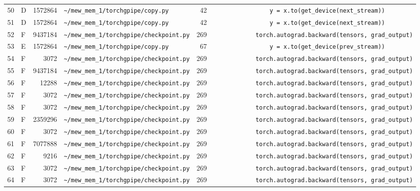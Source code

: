 \documentclass{article}
\begin{document}
\begin{longtable}{r l r p{6.5cm} r p{7.0cm}}
50 & D & 1572864 & \lstinline|~/mew_mem_1/torchgpipe/copy.py| & 42 & \lstinline|                y = x.to(get_device(next_stream))| \\
51 & D & 1572864 & \lstinline|~/mew_mem_1/torchgpipe/copy.py| & 42 & \lstinline|                y = x.to(get_device(next_stream))| \\
52 & F & 9437184 & \lstinline|~/mew_mem_1/torchgpipe/checkpoint.py| & 269 & \lstinline|            torch.autograd.backward(tensors, grad_output)| \\
53 & E & 1572864 & \lstinline|~/mew_mem_1/torchgpipe/copy.py| & 67 & \lstinline|                y = x.to(get_device(prev_stream))| \\
54 & F & 3072 & \lstinline|~/mew_mem_1/torchgpipe/checkpoint.py| & 269 & \lstinline|            torch.autograd.backward(tensors, grad_output)| \\
55 & F & 9437184 & \lstinline|~/mew_mem_1/torchgpipe/checkpoint.py| & 269 & \lstinline|            torch.autograd.backward(tensors, grad_output)| \\
56 & F & 12288 & \lstinline|~/mew_mem_1/torchgpipe/checkpoint.py| & 269 & \lstinline|            torch.autograd.backward(tensors, grad_output)| \\
57 & F & 3072 & \lstinline|~/mew_mem_1/torchgpipe/checkpoint.py| & 269 & \lstinline|            torch.autograd.backward(tensors, grad_output)| \\
58 & F & 3072 & \lstinline|~/mew_mem_1/torchgpipe/checkpoint.py| & 269 & \lstinline|            torch.autograd.backward(tensors, grad_output)| \\
59 & F & 2359296 & \lstinline|~/mew_mem_1/torchgpipe/checkpoint.py| & 269 & \lstinline|            torch.autograd.backward(tensors, grad_output)| \\
60 & F & 3072 & \lstinline|~/mew_mem_1/torchgpipe/checkpoint.py| & 269 & \lstinline|            torch.autograd.backward(tensors, grad_output)| \\
61 & F & 7077888 & \lstinline|~/mew_mem_1/torchgpipe/checkpoint.py| & 269 & \lstinline|            torch.autograd.backward(tensors, grad_output)| \\
62 & F & 9216 & \lstinline|~/mew_mem_1/torchgpipe/checkpoint.py| & 269 & \lstinline|            torch.autograd.backward(tensors, grad_output)| \\
63 & F & 3072 & \lstinline|~/mew_mem_1/torchgpipe/checkpoint.py| & 269 & \lstinline|            torch.autograd.backward(tensors, grad_output)| \\
64 & F & 3072 & \lstinline|~/mew_mem_1/torchgpipe/checkpoint.py| & 269 & \lstinline|            torch.autograd.backward(tensors, grad_output)| \\

\end{longtable}
\end{document}

